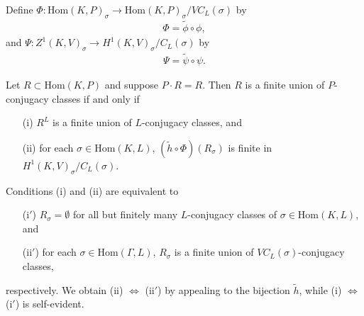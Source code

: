 \begin{definition} Define $\Phi:\mathrm{Hom}(K, P)_\sigma \rightarrow \mathrm{Hom}(K, P)_\sigma/VC_L(\sigma)$ by
\begin{align*}
	\Phi = \widetilde{\phi} \circ \phi,
\end{align*}
and $\Psi:Z^1(K, V)_\sigma \rightarrow H^1(K, V)_\sigma/C_L(\sigma)$ by
\begin{align*}
	\Psi = \widetilde{\psi} \circ \psi.
\end{align*}
\end{definition}

\begin{theorem} Let $R \subset \mathrm{Hom}(K, P)$ and suppose $P \cdot R = R$. Then $R$ is a finite union of $P$-conjugacy classes if and only if
	\begin{itemize}
		\item[(i)] $R^L$ is a finite union of $L$-conjugacy classes, and
		\item[(ii)] for each $\sigma \in \mathrm{Hom}(K, L)$, $(\widetilde{h} \circ \Phi)(R_\sigma)$ is finite in $H^1(K, V)_\sigma/C_L(\sigma)$.
	\end{itemize}
\end{theorem}
\begin{remark} Conditions (i) and (ii) are equivalent to 
	\begin{itemize}
		\item[(i$'$)] $R_\sigma = \emptyset$ for all but finitely many $L$-conjugacy classes of $\sigma \in \mathrm{Hom}(K, L)$, and
		\item[(ii$'$)] for each $\sigma \in \mathrm{Hom}(\Gamma, L)$, $R_\sigma$ is a finite union of $VC_L(\sigma)$-conjugacy classes,
	\end{itemize}
	respectively. We obtain (ii) $\Leftrightarrow$ (ii$'$) by appealing to the bijection $\widetilde{h}$, while (i) $\Leftrightarrow$ (i$'$) is self-evident.
\end{remark}
